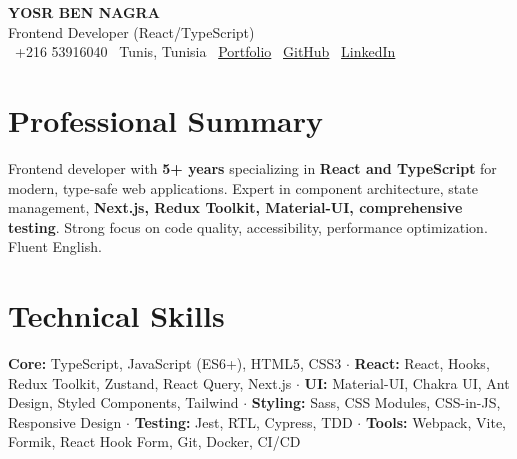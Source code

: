\documentclass[10pt,a4paper]{article}
\begin{document}
\begin{center}
  {\Large\bfseries\color{primary} YOSR BEN NAGRA}\\[2pt]
  {\small\color{darkgray} Frontend Developer (React/TypeScript)}\\[3pt]
  {\footnotesize
    \faPhone\ +216 53916040 \quad
    \faMapMarker*\ Tunis, Tunisia \quad
    \faGlobe\ \href{https://portfolio-yosr.vercel.app/en}{Portfolio} \quad
    \faGithub\ \href{https://github.com/YosrBennagra}{GitHub} \quad
    \faLinkedin\ \href{https://www.linkedin.com/in/yosr-ben-nagra/}{LinkedIn}
  }
\end{center}

\section*{Professional Summary}
{\small
Frontend developer with \textbf{5+ years} specializing in \textbf{React and TypeScript} for modern, type-safe web applications. Expert in component architecture, state management, \textbf{Next.js, Redux Toolkit, Material-UI, comprehensive testing}. Strong focus on code quality, accessibility, performance optimization. Fluent English.
}

\vspace{6pt}

\section*{Technical Skills}
{\small
\textbf{Core:} TypeScript, JavaScript (ES6+), HTML5, CSS3 $\cdot$ \textbf{React:} React, Hooks, Redux Toolkit, Zustand, React Query, Next.js $\cdot$ \textbf{UI:} Material-UI, Chakra UI, Ant Design, Styled Components, Tailwind $\cdot$ \textbf{Styling:} Sass, CSS Modules, CSS-in-JS, Responsive Design $\cdot$ \textbf{Testing:} Jest, RTL, Cypress, TDD $\cdot$ \textbf{Tools:} Webpack, Vite, Formik, React Hook Form, Git, Docker, CI/CD
}

\vspace{6pt}

\end{document}
